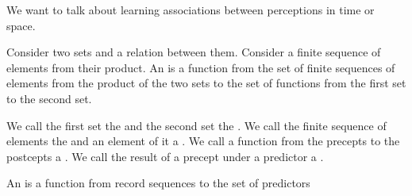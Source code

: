 
\sbasic






\sstart
{}


We want to talk about learning
associations between perceptions
in time or space.


Consider two sets
and a relation between them.
Consider a finite sequence of elements
from their product.
An  is a function
from the set of finite sequences of
elements from the product of the two
sets to the set of functions from
the first set to the second set.

We call the first set the
 and the second
set the
.
We call the finite sequence of
elements the 
and an element of it a .
We call a function from the precepts
to the postcepts a .
We call the result of a precept
under a predictor a .

An  is a function
from record sequences to the
set of predictors
\strats
